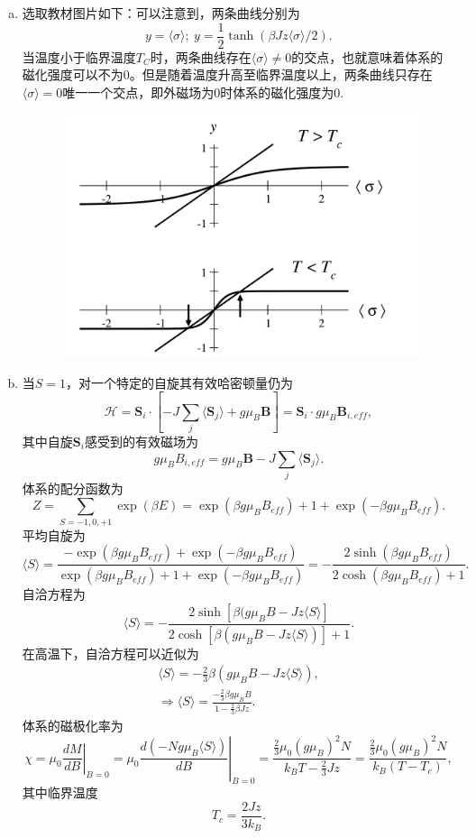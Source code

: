 \documentclass[reqno,a4paper,12pt]{amsart}
\begin{document}
\begin{enumerate}[1.]
\begin{tcolorbox}[breakable, colframe = black, colback = black!5!white]
\begin{enumerate}[(a)]
\item 选取教材图片如下：可以注意到，两条曲线分别为
\[
	y = \langle \sigma \rangle; ~ y = \frac{1}{2}\tanh(\beta Jz\langle\sigma\rangle/2).
\]
当温度小于临界温度$T_C$时，两条曲线存在$\langle \sigma \rangle \neq 0$的交点，也就意味着体系的磁化强度可以不为0。但是随着温度升高至临界温度以上，两条曲线只存在$\langle \sigma \rangle = 0$唯一一个交点，即外磁场为0时体系的磁化强度为0.
\begin{figure}[H]
	\centering
	\includegraphics[width = 120mm]{22.1.jpeg}
	\caption{}
\end{figure}

\item 当$S=1$，对一个特定的自旋其有效哈密顿量仍为
\[
	\mathcal{H}=\mathbf{S}_i\cdot\left[-J\sum_j\langle\mathbf{S}_j\rangle+g\mu_B\mathbf{B}\right]=\mathbf{S}_i\cdot g\mu_B\mathbf{B}_{i,eff},
\]
其中自旋$\mathbf{S}_i$感受到的有效磁场为
\[
	g\mu_BB_{i,eff}=g\mu_B\mathbf{B}-J\sum_j\langle\mathbf{S}_j\rangle.
\]
体系的配分函数为
\[
	Z=\sum_{S=-1,0,+1}\exp(\beta E)=\exp(\beta g\mu_BB_{eff})+1+\exp(-\beta g\mu_BB_{eff}).
\]
平均自旋为
\[
	\langle S\rangle=\frac{-\exp(\beta g\mu_BB_{eff})+\exp(-\beta g\mu_BB_{eff})}{\exp(\beta g\mu_BB_{eff})+1+\exp(-\beta g\mu_BB_{eff})}=-\frac{2\sinh(\beta g\mu_BB_{eff})}{2\cosh(\beta g\mu_BB_{eff})+1}.
\]
自洽方程为
\[
	\langle S\rangle=-\frac{2\sinh[\beta(g\mu_BB-Jz\langle S\rangle]}{2\cosh[\beta(g\mu_BB-Jz\langle S\rangle)]+1}.
\]
在高温下，自洽方程可以近似为
\begin{gather*}
	\langle S\rangle=-\frac{2}{3}\beta(g\mu_BB-Jz\langle S\rangle),\\
	\Longrightarrow\langle S\rangle=\frac{-\frac{2}{3}\beta g\mu_BB}{1-\frac{2}{3}\beta Jz}.
\end{gather*}
体系的磁极化率为
\[
	\chi=\mu_0\left.\frac{dM}{dB}\right\rvert_{B=0}=\mu_0\left.\frac{d(-Ng\mu_B\langle S\rangle)}{dB}\right\rvert_{B=0}=\frac{\frac{2}{3}\mu_0(g\mu_B)^2N}{k_BT-\frac{2}{3}Jz}=\frac{\frac{2}{3}\mu_0(g\mu_B)^2N}{k_B(T-T_c)},
\]
其中临界温度
\[
	T_c=\frac{2Jz}{3k_B}.
\]


\end{enumerate}
\end{tcolorbox}
\end{enumerate}
\end{document}
